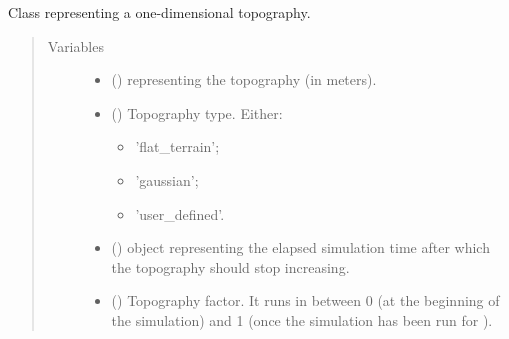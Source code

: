 \documentclass[letterpaper,10pt,english]{sphinxmanual}
\begin{document}
\begin{fulllineitems}
\label{\detokenize{api:grids.topography.Topography1d}}
Class representing a one-dimensional topography.
\begin{quote}\begin{description}
\item[{Variables}] \leavevmode\begin{itemize}
\item {} 
 () \textendash{}  representing the topography (in meters).

\item {} 
 () \textendash{} 
Topography type. Either:
\begin{itemize}
\item {} 
’flat\_terrain’;

\item {} 
’gaussian’;

\item {} 
’user\_defined’.

\end{itemize}


\item {} 
 () \textendash{}  object representing the elapsed simulation time after which the topography
should stop increasing.

\item {} 
 () \textendash{} Topography factor. It runs in between 0 (at the beginning of the simulation) and 1 (once the simulation
has been run for ).

\end{itemize}

\end{description}\end{quote}


\end{fulllineitems}
\end{document}
